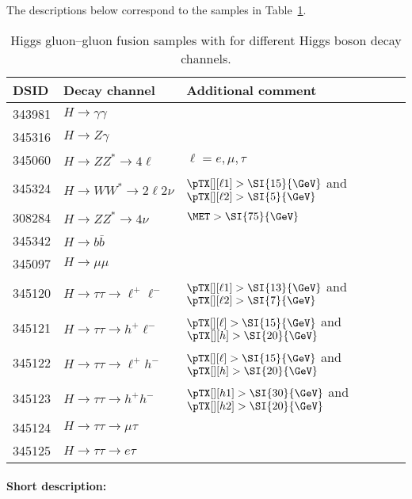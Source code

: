 The descriptions below correspond to the samples in Table~\ref{tab:higgs-ggH-samples}.
\begin{table}[!htbp]
  \caption{\POWHEG Higgs gluon--gluon fusion samples with \POWPY[8] for different Higgs boson decay channels.}%
  \label{tab:higgs-ggH-samples}
  \centering
  \begin{tabular}{ l | l | l}
    \toprule
    DSID   & Decay channel & Additional comment \\
    \midrule
    343981 & $H\to\gamma\gamma$&   \\
    345316 & $H\to Z\gamma$ & \\
    345060 & $H\to ZZ^{*} \to 4\ell $ & $\ell=e,\mu,\tau$   \\
    345324 & $H\to WW^{*} \to 2\ell2\nu $ &  $\pTX[][\ell1] > \SI{15}{\GeV}$ and $\pTX[][\ell2] > \SI{5}{\GeV}$ \\
    308284 & $H\to ZZ^{*}\to 4\nu$ & $\MET > \SI{75}{\GeV}$\\
    345342 & $H\to b \bar{b}$ & \\
    345097 & $H\to\mu\mu$      &     \\
    345120 & $H\to\tau\tau\to \ell^{+}\ell^{-}$ & $\pTX[][\ell1] > \SI{13}{\GeV}$ and $\pTX[][\ell2] > \SI{7}{\GeV}$ \\
    345121 & $H\to\tau\tau\to h^{+}\ell^{-}$    & $\pTX[][\ell]  > \SI{15}{\GeV}$ and $\pTX[][h]     > \SI{20}{\GeV}$ \\
    345122 & $H\to\tau\tau\to \ell^{+}h^{-}$    & $\pTX[][\ell]  > \SI{15}{\GeV}$ and $\pTX[][h]     > \SI{20}{\GeV}$ \\
    345123 & $H\to\tau\tau\to h^{+}h^{-}$       & $\pTX[][h1]    > \SI{30}{\GeV}$ and $\pTX[][h2]    > \SI{20}{\GeV}$ \\
    345124 & $H\to\tau\tau\to \mu\tau$          & \\ %
    345125 & $H\to\tau\tau\to e \tau$           & \\ %
    \bottomrule
  \end{tabular}
\end{table}

\paragraph{Short description:}


